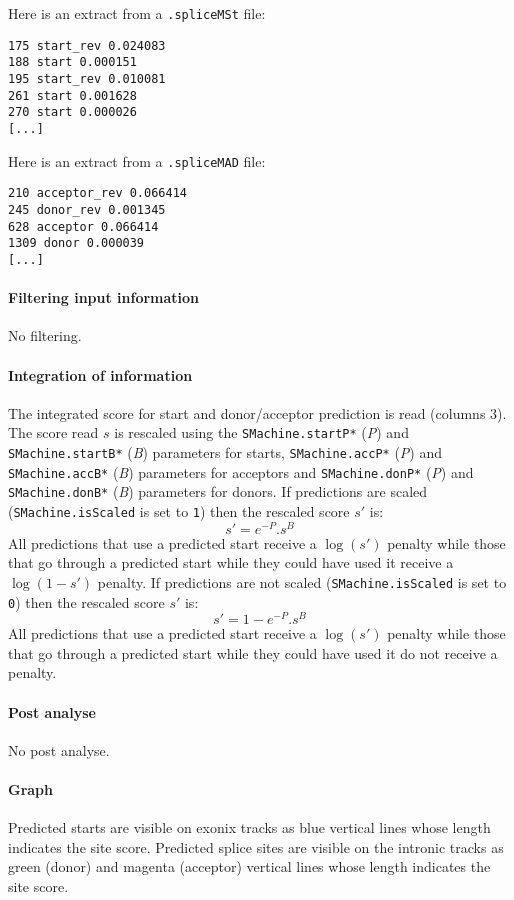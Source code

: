 Here is an extract from a \texttt{.spliceMSt} file:
\begin{Verbatim}[fontsize=\small]
175 start_rev 0.024083
188 start 0.000151
195 start_rev 0.010081
261 start 0.001628
270 start 0.000026
[...]
\end{Verbatim}

Here is an extract from a \texttt{.spliceMAD} file:
\begin{Verbatim}[fontsize=\small]
210 acceptor_rev 0.066414
245 donor_rev 0.001345
628 acceptor 0.066414
1309 donor 0.000039
[...]
\end{Verbatim}


\paragraph{Filtering input information}

No filtering.

\paragraph{Integration of information}

The integrated score for start and donor/acceptor prediction is read (columns 3). 
The score read $s$ is rescaled using the {\tt SMachine.startP*} (\emph{P}) and 
{\tt SMachine.startB*} (\emph{B}) parameters for starts,
 {\tt SMachine.accP*} (\emph{P}) and 
{\tt SMachine.accB*} (\emph{B}) parameters for acceptors and {\tt SMachine.donP*} 
(\emph{P}) and {\tt SMachine.donB*} (\emph{B}) parameters for donors.
If predictions are scaled ({\tt SMachine.isScaled} is set to {\tt 1}) then the rescaled score  $s'$ is:
\[s' = e^{-P}.s^B\]
All predictions that use a predicted start receive a $\log(s')$
penalty while those that go through a predicted start while they
could have used it receive a $\log(1-s')$ penalty.
If predictions are not scaled ({\tt SMachine.isScaled} is set to {\tt 0}) then the rescaled score  $s'$ is:
\[s' = 1 - e^{-P}.s^B\]
 All predictions that use a predicted start receive a $\log(s')$
penalty while those that go through a predicted start while they
could have used it do not receive a penalty.


\paragraph{Post analyse}

No post analyse.

\paragraph{Graph}

Predicted starts are visible on exonix tracks as blue vertical lines
whose length indicates the site score.
Predicted splice sites are visible on the intronic tracks as green
(donor) and magenta (acceptor) vertical lines whose length indicates
the site score.




